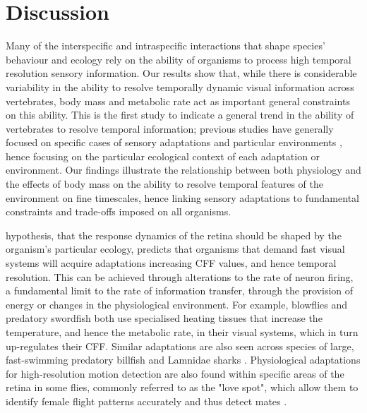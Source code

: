\section{Discussion}
Many of the interspecific and intraspecific interactions that shape species' behaviour and ecology rely on the ability of organisms to process high temporal resolution sensory information. Our results show that, while there is considerable variability in the ability to resolve temporally dynamic visual information across vertebrates, body mass and metabolic rate act as important general constraints on this ability. This is the first study to indicate a general trend in the ability of vertebrates to resolve temporal information; previous studies have generally focused on specific cases of sensory adaptations \citep{fritsches2005warm} and particular environments \citep{frank1999comparative,frank2012light}, hence focusing on the particular ecological context of each adaptation or environment. Our findings illustrate the relationship between both physiology and the effects of body mass on the ability to resolve temporal features of the environment on fine timescales, hence linking sensory adaptations to fundamental constraints and trade-offs imposed on all organisms.

\cite{autrum1958electrophysiological} hypothesis, that the response dynamics of the retina should be shaped by the organism's particular ecology, predicts that organisms that demand fast visual systems will acquire adaptations increasing CFF values, and hence temporal resolution. This can be achieved through alterations to the rate of neuron firing, a fundamental limit to the rate of information transfer, through the provision of energy \citep{laughlin2001energy} or changes in the physiological environment. For example, blowflies \citep{tatler2000temperature} and predatory swordfish \citep{fritsches2005warm} both use specialised heating tissues that increase the temperature, and hence the metabolic rate, in their visual systems, which in turn up-regulates their CFF. Similar adaptations are also seen across species of large, fast-swimming predatory billfish \citep{carey1982brain} and Lamnidae sharks \citep{block1985warm}. Physiological adaptations for high-resolution motion detection are also found within specific areas of the retina in some flies, commonly referred to as the "love spot", which allow them to identify female flight patterns accurately and thus detect mates \citep{land1974chasing}.

